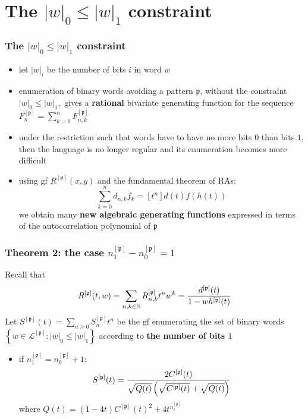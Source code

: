 \documentclass{beamer}
\begin{document}
\iffalse
\begin{frame}\frametitle{A Lemma}

 Let $\mathfrak{p}$ be  a Riordan pattern. Then the Riordan array ${{R}^{[\mathfrak{p}]}}$ is characterized by the  $A$-matrix
defined by the following relation:
$$R_{n+1,k+1}^{[\mathfrak{p}]}=R_{n,k}^{[\mathfrak{p}]}
+R_{n+1,k+2}^{[\mathfrak{p}]}-R_{n+1-n_1^{\mathfrak{p}},k+1+n_0^{\mathfrak{p}}-n_1^{\mathfrak{p}}}^{[\mathfrak{p}]} +$$
$$- \sum_{i\geq 1} c_{2i}\left(  R_{n+1-i,k+1}^{[\mathfrak{p}]} -R_{n-i,k}^{[\mathfrak{p}]} -R_{n+1-i,k+2}^{[\mathfrak{p}]} \right),$$
where  the  $c_i$ are given by the autocorrelation vector of
$\mathfrak{p}.$
\end{frame}
\fi

\section{The $|w|_{0}\leq |w|_{1}$ constraint}

\begin{frame}\frametitle{The $|w|_{0}\leq |w|_{1}$ constraint}
\begin{itemize}
\item let $|w|_{i}$ be the number of bits $i$ in word $w$
\item enumeration of binary words avoiding a pattern $\mathfrak{p}$, without the
constraint $|w|_0\leq |w|_1,$ gives a {\bf \red rational} bivariate generating function
for the sequence $F^{[\mathfrak{p}]}_n=\sum_{k=0}^nF_{n,k}^{[\mathfrak{p}]}$
\item under the restriction such that words have to have no more bits $0$ than
bits $1$, then the language is no longer regular and its enumeration becomes
more difficult
\item using gf $R^{[\mathfrak{p}]}(x,y)$ and the fundamental theorem of RAs:
$$\sum_{k=0}^n d_{n,k}f_k=[t^n]d(t)f(h(t)) $$ we obtain many {\bf \red new
algebraic generating functions} expressed in terms of the autocorrelation
polynomial of  $\mathfrak{p}$
\end{itemize}
\end{frame}

\begin{frame}\frametitle{Theorem 2: the case $n_1^{[\mathfrak{p}]}-n_0^{[\mathfrak{p}]}=1$}
Recall that 
\begin{displaymath}
    R^{[\mathfrak{p}]}(t,w)=\sum_{n,k\in\mathbb{N}} R_{n, k}^{[\mathfrak{p}]}t^n
    w^k={d^{[\mathfrak{p}]}(t) \over 1-wh^{[\mathfrak{p}]}(t)}
\end{displaymath}
Let $S^{[\mathfrak{p}]}(t)=\sum_{n\geq 0}S_n^{[\mathfrak{p}]}t^n$ be the gf
enumerating the set of binary words $\left\lbrace
w\in\mathcal{L}^{[\mathfrak{p}]} : |w|_0\leq |w|_1\right\rbrace$ according to
{\bf \red the number of bits $1$}
\begin{itemize}
\item if $n_1^{[\mathfrak{p}]}=n_0^{[\mathfrak{p}]}+1:$
$$S^{[\mathfrak{p}]}(t)={2C^{[\mathfrak{p}]}(t) \over \sqrt{Q(t)}\left(\sqrt{C^{[\mathfrak{p}]}(t)}+ \sqrt{Q(t)} \right)} $$
    where $Q(t)={(1-4t)C^{[\mathfrak{p}]}(t)^2+4t^{n_1^{[\mathfrak{p}]}}}$
\end{itemize}
\end{frame}
\end{document}
